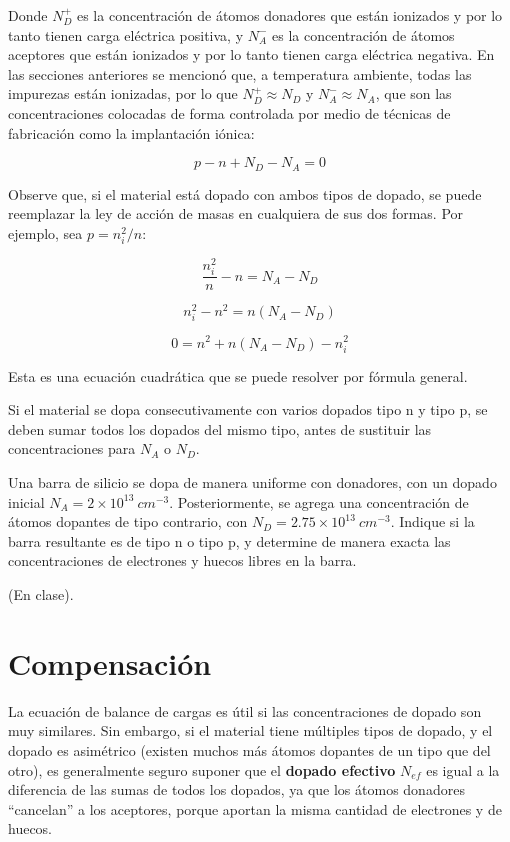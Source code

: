 Donde $N_D^+$ es la concentración de átomos donadores que están ionizados y por lo tanto tienen carga eléctrica positiva, y $N_A^-$ es la concentración de átomos aceptores que están ionizados y por lo tanto tienen carga eléctrica negativa. En las secciones anteriores se mencionó que, a temperatura ambiente, todas las impurezas están ionizadas, por lo que $N_D^+ \approx N_D$ y $N_A^- \approx N_A$, que son las concentraciones colocadas de forma controlada por medio de técnicas de fabricación como la implantación iónica:

\[ p - n + N_D - N_A = 0 \]

Observe que, si el material está dopado con ambos tipos de dopado, se puede reemplazar la ley de acción de masas en cualquiera de sus dos formas. Por ejemplo, sea $p=n_i^2/n$:

\[ \dfrac{n_i^2}{n} - n = N_A - N_D \]

\[ n_i^2-n^2= n (N_A-N_D) \]

\[ 0 = n^2 + n(N_A-N_D) - n_i^2 \]

Esta es una ecuación cuadrática que se puede resolver por fórmula general.

Si el material se dopa consecutivamente con varios dopados tipo n y tipo p, se deben sumar todos los dopados del mismo tipo, antes de sustituir las concentraciones para $N_A$ o $N_D$.


\begin{ejemplo}
Una barra de silicio se dopa de manera uniforme con donadores, con un dopado inicial $N_A = 2\times{}10^{13}\ cm^{-3}$. Posteriormente, se agrega una concentración de átomos dopantes de tipo contrario, con $N_D = 2.75\times{}10^{13}\ cm^{-3}$. Indique si la barra resultante es de tipo n o tipo p, y determine de manera exacta las concentraciones de electrones y huecos libres en la barra.
\end{ejemplo}


\begin{solucion}
(En clase).
\end{solucion}

\newpage
\section{Compensación}

La ecuación de balance de cargas es útil si las concentraciones de dopado son muy similares. Sin embargo, si el material tiene múltiples tipos de dopado, y el dopado es asimétrico (existen muchos más átomos dopantes de un tipo que del otro), es generalmente seguro suponer que el \textbf{dopado efectivo} $N_{ef}$ es igual a la diferencia de las sumas de todos los dopados, ya que los átomos donadores “cancelan” a los aceptores, porque aportan la misma cantidad de electrones y de huecos. 

